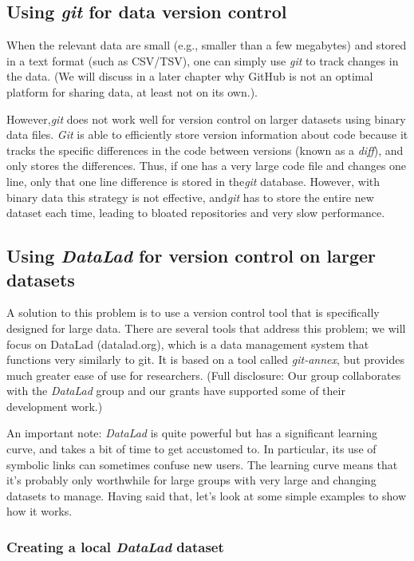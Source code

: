 \subsection{Using \textit{git} for data version control}

When the relevant data are small (e.g., smaller than a few megabytes) and stored in a text format (such as CSV/TSV), one can simply use \textit{git} to track changes in the data.  (We will discuss in a later chapter why GitHub is not an optimal platform for sharing data, at least not on its own.).

However,\textit{git} does not work well for version control on larger datasets using binary data files.  \textit{Git} is able to efficiently store version information about code because it tracks the specific differences in the code between versions (known as a \textit{diff}), and only stores the differences.  Thus, if one has a very large code file and changes one line, only that one line difference is stored in the\textit{git} database.  However, with binary data this strategy is not effective, and\textit{git} has to store the entire new dataset each time, leading to bloated repositories and very slow performance.

\subsection{Using \textit{DataLad} for version control on larger datasets}

A solution to this problem is to use a version control tool that is specifically designed for large data.  There are several tools that address this problem; we will focus on DataLad (datalad.org), which is a data management system that functions very similarly to git.  It is based on a tool called \textit{git-annex}, but provides much greater ease of use for researchers.  (Full disclosure: Our group collaborates with the \textit{DataLad} group and our grants have supported some of their development work.)

An important note: \textit{DataLad} is quite powerful but has a significant learning curve, and takes a bit of time to get accustomed to.  In particular, its use of symbolic links can sometimes confuse new users. The learning curve means that it's probably only worthwhile for large groups with very large and changing datasets to manage. Having said that, let's look at some simple examples to show how it works.

\subsubsection{Creating a local \textit{DataLad} dataset}

